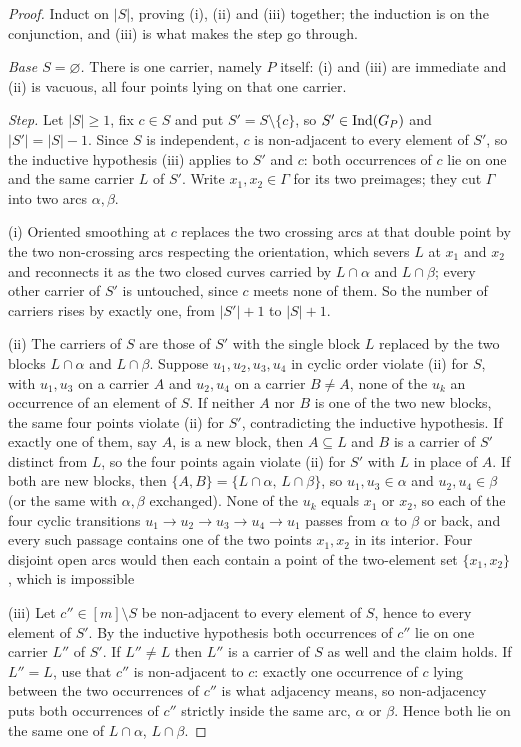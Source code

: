 \begin{proof}
Induct on $|S|$, proving (i), (ii) and (iii) together; the induction is on the
conjunction, and (iii) is what makes the step go through.

\emph{Base $S=\varnothing$.} There is one carrier, namely $P$ itself: (i) and
(iii) are immediate and (ii) is vacuous, all four points lying on that one
carrier.

\emph{Step.} Let $|S|\geq1$, fix $c\in S$ and put $S'=S\setminus\{c\}$, so
$S'\in\operatorname{Ind}(G_P)$ and $|S'|=|S|-1$. Since $S$ is independent, $c$ is non-adjacent
to every element of $S'$, so the inductive hypothesis (iii) applies to $S'$ and
$c$: both occurrences of $c$ lie on one and the same carrier $L$ of $S'$. Write $x_1,x_2\in\Gamma$ for its two preimages; they cut $\Gamma$ into two
arcs $\alpha,\beta$.

(i) Oriented smoothing at $c$ replaces the two crossing arcs at that double point
by the two non-crossing arcs respecting the orientation, which severs $L$ at
$x_1$ and $x_2$ and reconnects it as the two closed curves carried by
$L\cap\alpha$ and $L\cap\beta$; every other carrier of $S'$ is untouched, since
$c$ meets none of them. So the number of carriers rises by exactly one, from
$|S'|+1$ to $|S|+1$.

(ii) The carriers of $S$ are those of $S'$ with the single block $L$ replaced by
the two blocks $L\cap\alpha$ and $L\cap\beta$. Suppose $u_1,u_2,u_3,u_4$ in cyclic
order violate (ii) for $S$, with $u_1,u_3$ on a carrier $A$ and $u_2,u_4$ on a
carrier $B\neq A$, none of the $u_k$ an occurrence of an element of $S$. If
neither $A$ nor $B$ is one of the two new blocks, the same four points violate
(ii) for $S'$, contradicting the inductive hypothesis. If exactly one of them, say
$A$, is a new block, then $A\subseteq L$ and $B$ is a carrier of $S'$ distinct
from $L$, so the four points again violate (ii) for $S'$ with $L$ in place of $A$.
If both are new blocks, then $\{A,B\}=\{L\cap\alpha,\,L\cap\beta\}$, so
$u_1,u_3\in\alpha$ and $u_2,u_4\in\beta$ (or the same with $\alpha,\beta$
exchanged). None of the $u_k$ equals $x_1$ or $x_2$, so each of the four cyclic
transitions $u_1\to u_2\to u_3\to u_4\to u_1$ passes from $\alpha$ to $\beta$ or
back, and every such passage contains one of the two points $x_1,x_2$ in its
interior. Four disjoint open arcs would then each contain a point of the
two-element set $\{x_1,x_2\}$, which is impossible

(iii) Let $c''\in[m]\setminus S$ be non-adjacent to every element of $S$, hence to
every element of $S'$. By the inductive hypothesis both occurrences of $c''$ lie
on one carrier $L''$ of $S'$. If $L''\neq L$ then $L''$ is a carrier of $S$ as
well and the claim holds. If $L''=L$, use that $c''$ is non-adjacent to $c$:
exactly one occurrence of $c$ lying between the two occurrences of $c''$ is what
adjacency means, so non-adjacency puts both occurrences of $c''$ strictly inside
the same arc, $\alpha$ or $\beta$. Hence both lie on the same one of
$L\cap\alpha$, $L\cap\beta$.


\end{proof}
